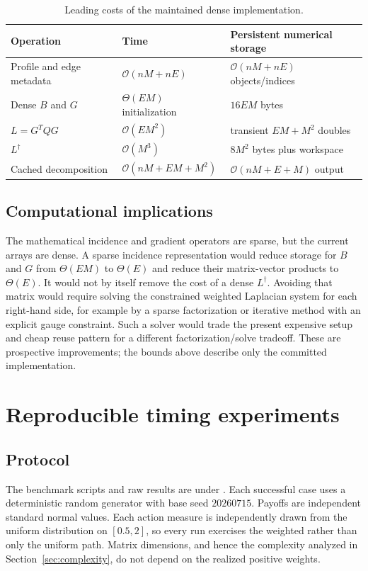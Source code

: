 \documentclass[11pt]{article}
\newcommand{\cO}{\mathcal{O}}
\begin{document}
\begin{table}[htbp]
\centering
\caption{Leading costs of the maintained dense implementation.}
\label{tab:complexity}
\small
\begin{tabularx}{\textwidth}{@{}lXX@{}}
\toprule
Operation & Time & Persistent numerical storage \\
\midrule
Profile and edge metadata & $\cO(nM+nE)$ & $\cO(nM+nE)$ objects/indices \\
Dense $B$ and $G$ & $\Theta(EM)$ initialization & $16EM$ bytes \\
$L=G^TQG$ & $\cO(EM^2)$ & transient $EM+M^2$ doubles \\
$L^\dagger$ & $\cO(M^3)$ & $8M^2$ bytes plus workspace \\
Cached decomposition & $\cO(nM+EM+M^2)$ & $\cO(nM+E+M)$ output \\
\bottomrule
\end{tabularx}
\end{table}

\subsection{Computational implications}

The mathematical incidence and gradient operators are sparse, but the current
arrays are dense.  A sparse incidence representation would reduce storage for
$B$ and $G$ from $\Theta(EM)$ to $\Theta(E)$ and reduce their matrix-vector
products to $\Theta(E)$.  It would not by itself remove the cost of a dense
$L^\dagger$.  Avoiding that matrix would require solving the constrained
weighted Laplacian system for each right-hand side, for example by a sparse
factorization or iterative method with an explicit gauge constraint.  Such a
solver would trade the present expensive setup and cheap reuse pattern for a
different factorization/solve tradeoff.  These are prospective improvements;
the bounds above describe only the committed implementation.

\section{Reproducible timing experiments}
\label{sec:experiments}

\subsection{Protocol}

The benchmark scripts and raw results are under
.  Each successful case
uses a deterministic random generator with base seed $20260715$.  Payoffs are
independent standard normal values.  Each action measure is independently
drawn from the uniform distribution on $[0.5,2]$, so every run exercises the
weighted rather than only the uniform path.  Matrix dimensions, and hence the
complexity analyzed in Section~\ref{sec:complexity}, do not depend on the
realized positive weights.
\end{document}
